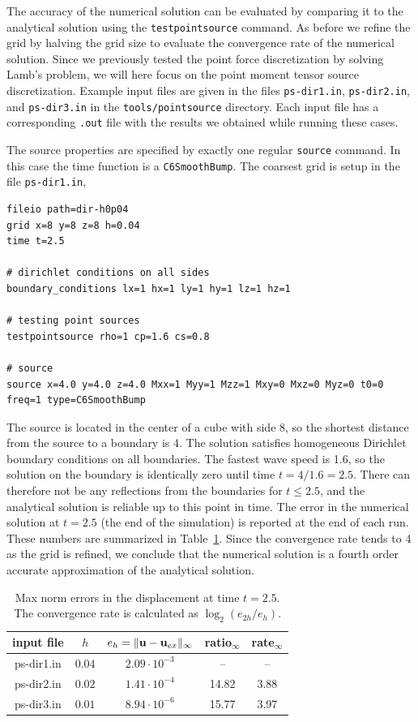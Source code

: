\documentclass[11pt]{report}
\newcommand{\ub}{{\bf u}}
\begin{document}
The accuracy of the numerical solution can be evaluated by comparing it to the analytical solution
using the \verb+testpointsource+ command. As before we refine the grid by halving the grid size to
evaluate the convergence rate of the numerical solution. Since we previously tested the point force
discretization by solving Lamb's problem, we will here focus on the point moment tensor source
discretization. Example input files are given in the files \verb+ps-dir1.in+, \verb+ps-dir2.in+,
and \verb+ps-dir3.in+ in the \verb+tools/pointsource+ directory. Each input file has a corresponding
\verb+.out+ file with the results we obtained while running these cases.

The source properties are specified by exactly one regular \verb+source+ command. In this case the
time function is a \verb+C6SmoothBump+. The coarsest grid is setup in the file \verb+ps-dir1.in+,
\begin{verbatim}
fileio path=dir-h0p04
grid x=8 y=8 z=8 h=0.04
time t=2.5

# dirichlet conditions on all sides
boundary_conditions lx=1 hx=1 ly=1 hy=1 lz=1 hz=1

# testing point sources
testpointsource rho=1 cp=1.6 cs=0.8

# source
source x=4.0 y=4.0 z=4.0 Mxx=1 Myy=1 Mzz=1 Mxy=0 Mxz=0 Myz=0 t0=0 freq=1 type=C6SmoothBump
\end{verbatim}

The source is located in the center of a cube with side 8, so the shortest distance from the source
to a boundary is 4.  The solution satisfies homogeneous Dirichlet boundary conditions on all
boundaries. The fastest wave speed is 1.6, so the solution on the boundary is identically zero until
time $t=4/1.6 = 2.5$. There can therefore not be any reflections from the boundaries for $t\leq
2.5$, and the analytical solution is reliable up to this point in time. The error in the numerical
solution at $t=2.5$ (the end of the simulation) is reported at the end of each run. These numbers
are summarized in Table~\ref{tab:point-source}. Since the convergence rate tends to 4 as the grid is
refined, we conclude that the numerical solution is a fourth order accurate approximation of the
analytical solution.
\begin{table}
\begin{center}
\begin{tabular}{| c | c | c | c  | c | }
\hline
input file & $h$ & $e_h=\| \ub - \ub_{ex}\|_\infty$  & ratio$_\infty$ & rate$_\infty$ \\ \hline
ps-dir1.in & $0.04$  & $2.09\cdot 10^{-3}$  &  --   & --   \\ \hline
ps-dir2.in & $0.02$  & $1.41\cdot 10^{-4}$  &  14.82 & 3.88 \\ \hline
ps-dir3.in & $0.01$  & $8.94\cdot 10^{-6}$  &  15.77 & 3.97 \\ \hline
\end{tabular}
\caption{Max norm errors in the displacement at time $t=2.5$. The convergence rate is calculated as
  $\log_2(e_{2h}/e_h)$. }
\label{tab:point-source}
\end{center}
\end{table}
\end{document}
